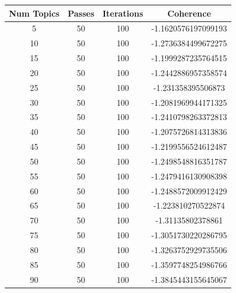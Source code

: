 \documentclass{report}
\begin{document}
{                \label{tab:hiperparametros_british_airline_neutras}
                \begin{longtable}{|c|c|c|c|}
                    \hline
                    \textbf{Num Topics} & \textbf{Passes} & \textbf{Iterations} & \textbf{Coherence} \\
                    \hline
                    5 & 50 & 100 & -1.1620576197099193 \\
                    \hline
                    10 & 50 & 100 & -1.2736384499672275 \\
                    \hline
                    15 & 50 & 100 & -1.1999287235764515 \\
                    \hline
                    20 & 50 & 100 & -1.2442886957358574 \\
                    \hline
                    25 & 50 & 100 & -1.231358395506873 \\
                    \hline
                    30 & 50 & 100 & -1.2081969944171325 \\
                    \hline
                    35 & 50 & 100 & -1.2410798263372813 \\
                    \hline
                    40 & 50 & 100 & -1.2075726814313836 \\
                    \hline
                    45 & 50 & 100 & -1.2199556524612487 \\
                    \hline
                    50 & 50 & 100 & -1.2498548816351787 \\
                    \hline
                    55 & 50 & 100 & -1.2479416130908398 \\
                    \hline
                    60 & 50 & 100 & -1.2488572009912429 \\
                    \hline
                    65 & 50 & 100 & -1.223810270522874 \\
                    \hline
                    70 & 50 & 100 & -1.31135802378861 \\
                    \hline
                    75 & 50 & 100 & -1.3051730220286795 \\
                    \hline
                    80 & 50 & 100 & -1.3263752929735506 \\
                    \hline
                    85 & 50 & 100 & -1.3597748254986766 \\
                    \hline
                    90 & 50 & 100 & -1.3845443155645067 \\
                    \hline

\end{longtable}}
\end{document}
